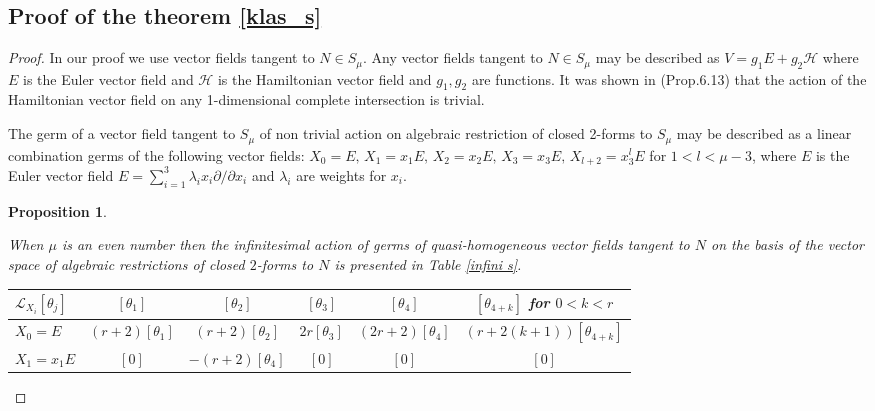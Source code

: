\documentclass{amsart}
\newtheorem{prop}[thm]{Proposition}
\theoremstyle{definition}
\numberwithin{equation}{section}
\begin{document}
\subsection{Proof of the theorem \ref{klas_s}}
\label{s-proof}

\begin{proof}

In our proof we use vector fields tangent to $N\in S_{\mu}$. Any vector fields tangent to $N\in S_{\mu}$ may be described as $V=g_1E+g_2\mathcal{H}$ where $E$ is the Euler vector field and $\mathcal{H}$ is the Hamiltonian vector field and $g_1,g_2$ are functions. It was shown in \cite{DT} (Prop.6.13) that the action of the Hamiltonian vector field on any 1-dimensional complete intersection is trivial.

The germ of a vector field tangent to $S_{\mu}$ of non trivial action on algebraic restriction of closed 2-forms to  $S_{\mu}$ may be described as a linear combination germs of the following vector fields:
$X_0\!=E,\, X_1\!=x_1E,\, X_2\!=x_2E,\, X_3\!=x_3E,\,  X_{l+2}\!=x_3^lE$ for $1\!<\!l\!<\!\mu\!-\!3$, where $E$ is the Euler vector field
$E=\sum_{i=1}^3 \lambda _i x_i \partial /\partial x_i$ and $\lambda _i$ are weights for $x_i$.

\begin{prop} \label{s-infinitesimal}

When $\mu$ is an even number then the infinitesimal action of germs of quasi-homogeneous vector
fields tangent to $N$ on the basis of the vector space of
algebraic restrictions of closed $2$-forms to $N$ is presented in
Table \ref{infini s}.
\begin{footnotesize}
\begin{table}[h]
\begin{center}
\begin{tabular}{|p{1.7cm}|c|c|c|c|c|}

 \hline

  $\mathcal L_{X_i} [\theta_j]$ & $[\theta_1]$   &   $[\theta_2]$ &   $[\theta_3]$ & $[\theta_4]$ & $[\theta_{4+k}]$ for $0\!<\!k\!<\!r$ \\ \hline 

  $X_0\!=\!E$  & $(r\!+\!2)[\theta_1]$& $(r\!+\!2)[\theta_2]$ & $2r[\theta_3]$ & $(2r\!+\!2)[\theta_4]$ & $(r\!+\!2(k\!+\!1)) [\theta_{4+k}]$ \\ \hline

  $X_1\!=\!x_1E$  & $ [0]$ & $-(r\!+\!2)[\theta_4]$ & $ [0]$ & $ [0]$ & $ [0]$ \\  \hline


\end{tabular}
\end{center}
\end{table}
\end{footnotesize}
\end{prop}
\end{proof}
\end{document}

